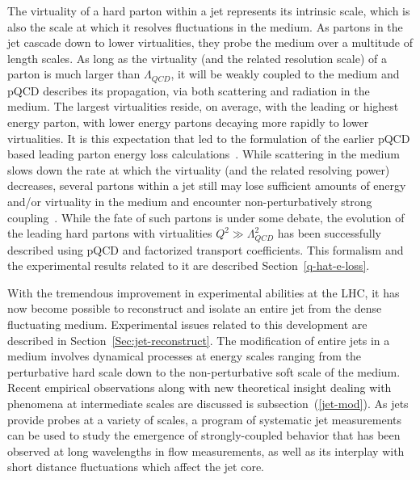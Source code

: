 The virtuality of a hard parton within a jet represents its intrinsic scale, which is also the scale at which it resolves fluctuations in the medium. 
As partons in the jet cascade down to lower virtualities, they probe the medium over a multitude of length scales. 
As long as the virtuality (and the related resolution scale) of a parton is much larger than $\Lambda_{QCD}$, it will be weakly coupled to the medium and 
pQCD  describes its propagation, via both scattering and radiation in the medium.
The largest virtualities reside, on average, with the leading or highest energy parton, with lower energy partons decaying more rapidly to lower virtualities. 
It is this expectation that led to the formulation of the earlier pQCD based leading parton energy loss calculations~\cite{Gyulassy:1993hr,Wang:1991xy,Baier:1996kr,Baier:1996sk,Zakharov:1996fv,Zakharov:1997uu}. 
While scattering in the medium slows down the rate at which
the virtuality (and the related resolving power) decreases,
several partons within a jet still may lose sufficient amounts of energy and/or virtuality in the medium and encounter 
non-perturbatively strong coupling~\cite{Chesler:2008uy,Chesler:2008wd,Friess:2006aw,CasalderreySolana:2006rq}. 
While the fate of such partons is under some debate, the evolution of the leading hard partons with virtualities $Q^{2} \gg \Lambda_{QCD}^{2}$ has been successfully  
described using pQCD and factorized transport coefficients. This formalism and the experimental results related to it are described Section~\ref{q-hat-e-loss}. 

With the tremendous improvement in experimental abilities at the LHC, it has now become possible to reconstruct and isolate an entire jet from the dense fluctuating medium.
Experimental issues related to this development are described in Section~\ref{Sec:jet-reconstruct}. The modification of entire jets in a medium involves dynamical processes at energy scales 
ranging from the perturbative hard scale down to the non-perturbative soft scale of the medium. Recent empirical observations along with new theoretical insight dealing with phenomena at intermediate scales are discussed is 
subsection~(\ref{jet-mod}).
As jets provide probes at a
variety of scales, a program of systematic jet measurements can be
used to study the emergence of strongly-coupled behavior that has been
observed at long wavelengths in flow measurements, as well as its interplay with short distance fluctuations which affect the jet core. 

